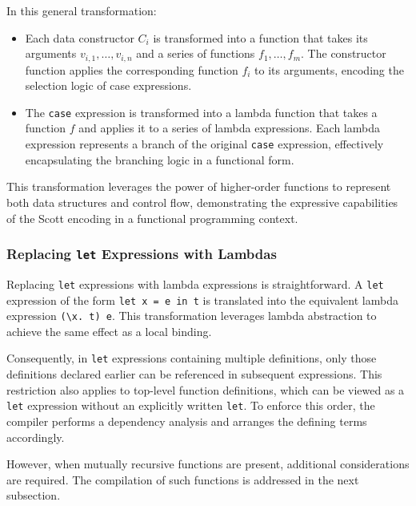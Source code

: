 \documentclass{IEEEtran}
\begin{document}
\par In this general transformation:
\begin{itemize}
    \item Each data constructor \(C_i\) is transformed into a function that takes its arguments \(v_{i,1}, \dots, v_{i,n}\) and a series of functions \(f_1, \dots, f_m\). The constructor function applies the corresponding function \(f_i\) to its arguments, encoding the selection logic of case expressions.
    \item The \texttt{case} expression is transformed into a lambda function that takes a function \(f\) and applies it to a series of lambda expressions. Each lambda expression represents a branch of the original \texttt{case} expression, effectively encapsulating the branching logic in a functional form.
\end{itemize}

\par This transformation leverages the power of higher-order functions to represent both data structures and control flow, demonstrating the expressive capabilities of the Scott encoding in a functional programming context.

\subsubsection{Replacing \texttt{let} Expressions with Lambdas}

\par Replacing \texttt{let} expressions with lambda expressions is straightforward. A \texttt{let} expression of the form \verb!let x = e in t! is translated into the equivalent lambda expression \verb!(\x. t) e!. This transformation leverages lambda abstraction to achieve the same effect as a local binding.

\par Consequently, in \texttt{let} expressions containing multiple definitions, only those definitions declared earlier can be referenced in subsequent expressions. This restriction also applies to top-level function definitions, which can be viewed as a \texttt{let} expression without an explicitly written \texttt{let}. To enforce this order, the compiler performs a dependency analysis and arranges the defining terms accordingly.

\par However, when mutually recursive functions are present, additional considerations are required. The compilation of such functions is addressed in the next subsection.
\end{document}

